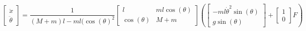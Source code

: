 \documentclass[12pt,letterpaper]{article}
\begin{document}
     \begin{equation*}
        \begin{bmatrix}
            \ddot x \\ \ddot \theta 
        \end{bmatrix}
        =
        \frac{1}{(M+m)l - ml(\cos(\theta)^2}
        \begin{bmatrix}
            l & ml\cos(\theta) \\ 
            \cos(\theta) & M+m 
        \end{bmatrix} 
        \left(
            \begin{bmatrix}
                -ml \dot \theta^2\sin(\theta)  \\ g\sin(\theta) 
            \end{bmatrix}
            +
            \begin{bmatrix}
             1 \\ 0 
            \end{bmatrix}
            F
        \right)
    \end{equation*}
    
    
\end{document}
